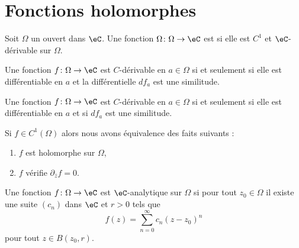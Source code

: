 
\section{Fonctions holomorphes}

\begin{definition}
    Soit \( \Omega\) un ouvert dans \( \eC\). Une fonction \( \Omega\colon \Omega\to \eC\) est  si elle est \( C^1\) et \( \eC\)-dérivable sur \( \Omega\). 
\end{definition}

\begin{proposition}
    Une fonction \( f\colon\Omega \to \eC\) est $C$-dérivable en \( a\in\Omega\) si et seulement si elle est différentiable en \( a\) et la différentielle \( df_a\) est une similitude.
\end{proposition}

\begin{proposition}
    Une fonction \( f\colon \Omega\to \eC\) est $C$-dérivable en \( a\in\Omega\) si et seulement si elle est différentiable en \( a\) et si \( df_a\) est une similitude.
\end{proposition}

\begin{theorem}
    Si \( f\in C^1(\Omega)\) alors nous avons équivalence des faits suivants :
    \begin{enumerate}
        \item
            \( f\) est holomorphe sur \( \Omega\),
        \item
            \( f\) vérifie \( \partial_{\bar z}f=0\).
    \end{enumerate}
\end{theorem}

\begin{definition}
    Une fonction \( f\colon \Omega\to \eC\) est \( \eC\)-analytique sur \( \Omega\) si pour tout \( z_0\in \Omega\) il existe une suite \( (c_n)\) dans \( \eC\) et \( r>0\) tels que
    \begin{equation}
        f(z)=\sum_{n=0}^{\infty}c_n(z-z_0)^n
    \end{equation}
    pour tout \( z\in B(z_0,r)\).
\end{definition}

